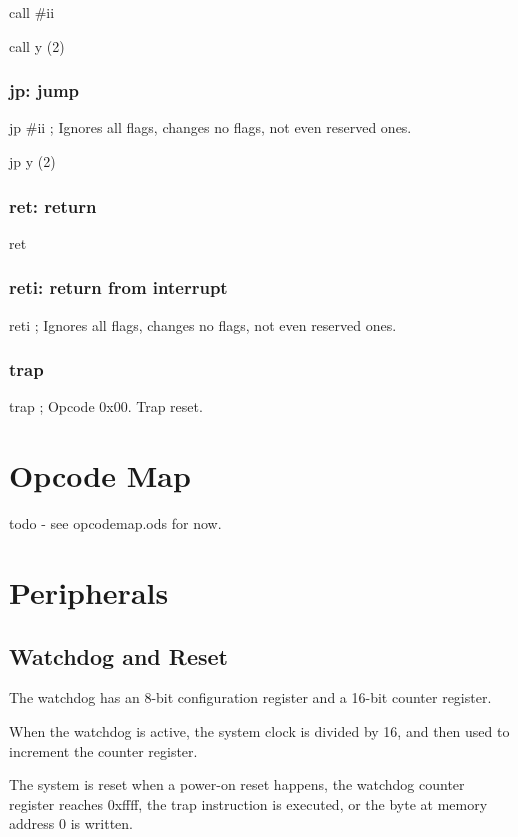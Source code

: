 \documentclass{book}
\begin{document}
call \#ii

call y (2)


\subsection{jp: jump}

jp \#ii     ; Ignores all flags, changes no flags, not even reserved ones.

jp y (2)


\subsection{ret: return}

ret


\subsection{reti: return from interrupt}

reti ; Ignores all flags, changes no flags, not even reserved ones.


\subsection{trap}

trap ; Opcode 0x00. Trap reset.

\chapter{Opcode Map}

todo - see opcodemap.ods for now.

\chapter{Peripherals}

\section{Watchdog and Reset}

The watchdog has an 8-bit configuration register and a 16-bit counter register.

When the watchdog is active, the system clock is divided by 16, and then used to increment the counter register.

The system is reset when a power-on reset happens, the watchdog counter register reaches 0xffff, the trap instruction is executed, or the byte at memory address 0 is written.
\end{document}
